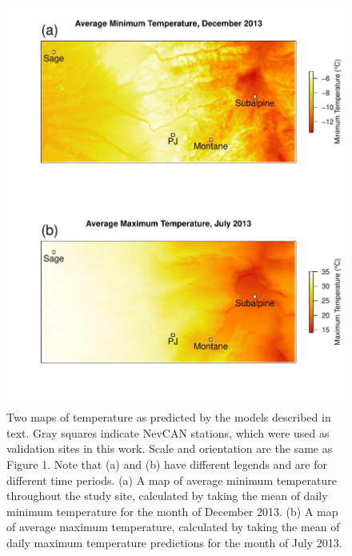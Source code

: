 \documentclass{ametsoc}
\begin{document}
\begin{figure}[ht]

\centerline{\includegraphics[width=39pc]{figure09_temperature-maps.pdf}}

\caption{Two maps of temperature as predicted by the models described in text. Gray squares indicate NevCAN stations, which were used as validation sites in this work. Scale and orientation are the same as Figure 1. Note that (a) and (b) have different legends and are for different time periods. (a) A map of average minimum temperature throughout the study site, calculated by taking the mean of daily minimum temperature for the month of December 2013. (b) A map of average maximum temperature, calculated by taking the mean of daily maximum temperature predictions for the month of July 2013.\label{fig:9}}

\end{figure}
\end{document}
